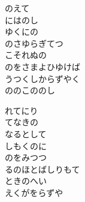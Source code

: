 \documentclass[10pt,b5j]{tarticle} %
\begin{document}
\begin{enumerate}
\begin{minipage}[c]{\blocksize}
        \vspace{\linespace}
        \item
        のえて\\
        にはのし\\
        ゆくにの\\
        のさゆらぎてつ\\
        こそれぬの\\
        のをさまよひゆけば\\
        うつくしからずやく\\
        ののこののし
        
        \vspace{\linespace}
        \item
        れてにり\\
        てなきの\\
        なるとして\\
        しもくのに\\
        のをみつつ\\
        るのほとばしりもて\\
        ときのへい\\
        えくがをらずや 
    
    \end{minipage}
\end{enumerate} %
\end{document}
